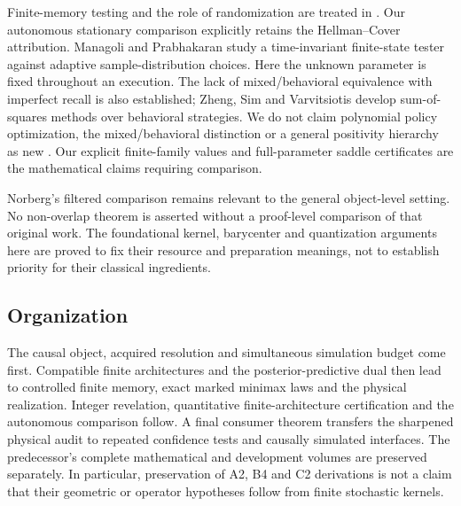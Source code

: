 Finite-memory testing and the role of randomization are treated in
\cite{HC,HCrandom,FH,CFH}. Our autonomous stationary comparison explicitly
retains the Hellman--Cover attribution. Managoli and Prabhakaran
\cite{MP} study a time-invariant finite-state tester against adaptive
sample-distribution choices. Here the unknown parameter is fixed
throughout an execution. The lack of mixed/behavioral equivalence with
imperfect recall is also established; Zheng, Sim and Varvitsiotis
\cite{ZSV} develop sum-of-squares methods over behavioral strategies.
We do not claim polynomial policy optimization, the mixed/behavioral
distinction or a general positivity hierarchy as new
\cite{MM,Putinar}. Our explicit finite-family values and full-parameter
saddle certificates are the mathematical claims requiring comparison.

Norberg's filtered comparison \cite{Norberg} remains relevant to the
general object-level setting. No non-overlap theorem is asserted without
a proof-level comparison of that original work. The foundational kernel,
barycenter and quantization arguments here are proved to fix their
resource and preparation meanings, not to establish priority for their
classical ingredients.

\subsection{Organization}
The causal object, acquired resolution and simultaneous simulation
budget come first. Compatible finite architectures and the
posterior-predictive dual then lead to controlled finite memory, exact
marked minimax laws and the physical realization. Integer revelation,
quantitative finite-architecture certification and the autonomous
comparison follow. A final consumer theorem transfers the sharpened
physical audit to repeated confidence tests and causally simulated
interfaces. The predecessor's complete mathematical and development
volumes are preserved separately. In particular, preservation of A2,
B4 and C2 derivations is not a claim that their geometric or operator
hypotheses follow from finite stochastic kernels.
